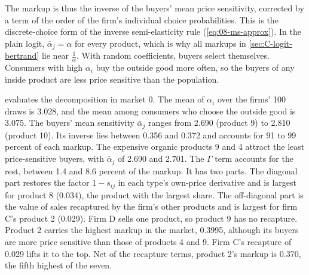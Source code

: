 The markup is thus the inverse of the buyers' mean price sensitivity, corrected by a term of the order of the
firm's individual choice probabilities. This is the discrete-choice form of the inverse semi-elasticity rule
(\cref{eq:08-ms-approx}). In the plain logit, $\bar\alpha_j = \alpha$ for every product, which is why all markups in
\cref{sec:C-logit-bertrand} lie near $\frac{1}{\alpha}$. With random coefficients, buyers select themselves. Consumers
with high $\alpha_i$ buy the outside good more often, so the buyers of any inside product are less price sensitive
than the population.

 evaluates the decomposition in market 0. The mean of $\alpha_i$ over the firms' 100 draws is 3.028,
and the mean among consumers who choose the outside good is 3.075. The buyers' mean sensitivity $\bar\alpha_j$ ranges
from 2.690 (product 9) to 2.810 (product 10). Its inverse lies between 0.356 and 0.372 and accounts for 91 to 99
percent of each markup. The expensive organic products 9 and 4 attract the least price-sensitive buyers, with
$\bar\alpha_j$ of 2.690 and 2.701. The $\Gamma$ term accounts for the rest, between 1.4 and 8.6 percent of the markup.
It has two parts. The diagonal part restores the factor $1 - s_{ij}$ in each type's own-price derivative and is
largest for product 8 (0.034), the product with the largest share. The off-diagonal part is the value of sales
recaptured by the firm's other products and is largest for firm C's product 2 (0.029). Firm D sells one product, so
product 9 has no recapture. Product 2 carries the highest markup in the market, 0.3995, although its buyers are more
price sensitive than those of products 4 and 9. Firm C's recapture of 0.029 lifts it to the top. Net of the recapture
terms, product 2's markup is 0.370, the fifth highest of the seven.

